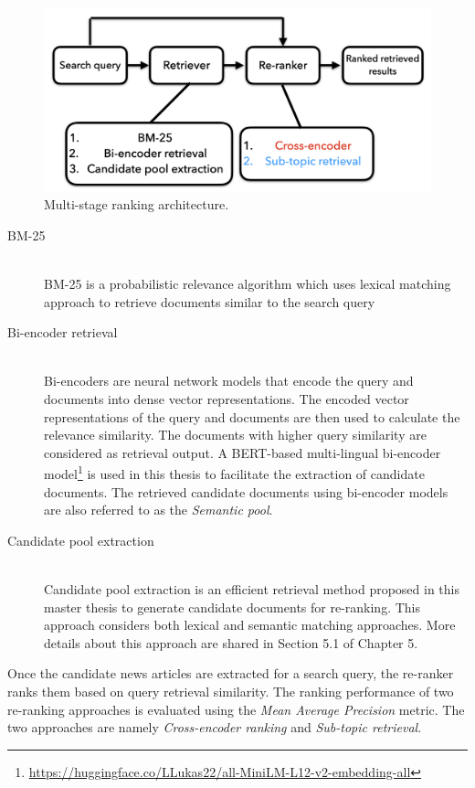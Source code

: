 \begin{figure}[h]
	\centering
	\includegraphics[width=.9\textwidth]{images/thesis_images/literature_review.png}
	\caption{Multi-stage ranking architecture. \label{fig:literature_review}}
\end{figure}

\begin{description}
	\item[BM-25]  \hfill \\ BM-25 is a probabilistic relevance algorithm which uses lexical matching approach to retrieve documents similar to the search query~\cite{amati_bm25_2009}
	
	\item[Bi-encoder retrieval]  \hfill \\ Bi-encoders are neural network models that encode the query and documents into dense vector representations. The encoded vector representations of the query and documents are then used to calculate the relevance similarity. The documents with higher query similarity are considered as retrieval output. A BERT-based multi-lingual bi-encoder model\footnote{\url{https://huggingface.co/LLukas22/all-MiniLM-L12-v2-embedding-all}} is used in this thesis to facilitate the extraction of candidate documents. The retrieved candidate documents using bi-encoder models are also referred to as the \textit{Semantic pool}.
	
	
	\item[Candidate pool extraction]  \hfill \\ Candidate pool extraction is an efficient retrieval method proposed in this master thesis to generate candidate documents for re-ranking. This approach considers both lexical and semantic matching approaches. More details about this approach are shared in Section 5.1 of Chapter 5.
	
\end{description}

Once the candidate news articles are extracted for a search query, the re-ranker ranks them based on query retrieval similarity. The ranking performance of two re-ranking approaches is evaluated using the \textit{Mean Average Precision} metric. The two approaches are namely \textit{Cross-encoder ranking} and \textit{Sub-topic retrieval}.




